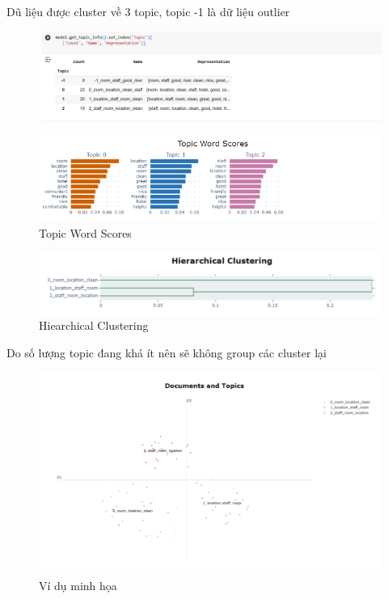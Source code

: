 \begin{enumerate}
    Dũ liệu được cluster về 3 topic, topic -1 là dữ liệu outlier

     \begin{figure}[H]
        \centering
        \includegraphics[width=1\linewidth]{Figures/8.15.png}
        \label{fig:enter-label}
    \end{figure}

     \begin{figure}[H]
        \centering
        \includegraphics[width=1\linewidth]{Figures/8.16.png}
        \caption{Topic Word Scores}
        \label{fig:enter-label}
    \end{figure}

     \begin{figure}[H]
        \centering
        \includegraphics[width=1\linewidth]{Figures/8.18.png}
        \caption{Hiearchical Clustering}
        \label{fig:enter-label}
    \end{figure}

    Do số lượng topic đang khá ít nên sẽ không group các cluster lại

     \begin{figure}[H]
        \centering
        \includegraphics[width=1\linewidth]{Figures/8.19.png}
        \caption{Ví dụ minh họa}
        \label{fig:enter-label}
    \end{figure}


\end{enumerate}
